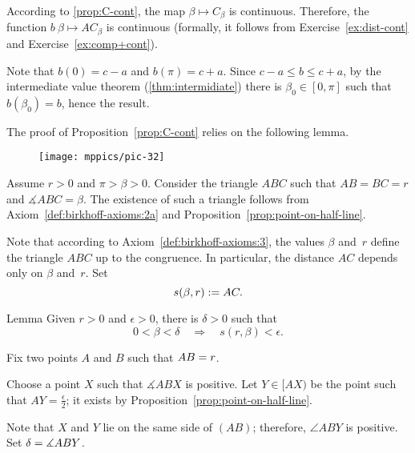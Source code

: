 According to \ref{prop:C-cont},
the map
$\beta\mapsto C_\beta$ is continuous.
Therefore, the function $b\:\beta\mapsto AC_\beta$ is continuous
(formally, it follows from Exercise~\ref{ex:dist-cont} and Exercise~\ref{ex:comp+cont}).

Note that $b(0)=c-a$ and $b(\pi)=c+a$.
Since $c-a\le b\le c+a$,
by the intermediate value theorem (\ref{thm:intermidiate})
there is $\beta_0\in[0,\pi]$ such that
$b(\beta_0)=b$,
hence the result. 
\qeds

The proof of Proposition~\ref{prop:C-cont} relies on the following lemma.

\begin{wrapfigure}{o}{27mm}
\vskip2mm
\centering
\texttt{[image: mppics/pic-32]}
\end{wrapfigure}

Assume $r>0$ and $\pi>\beta>0$.
Consider the triangle $ABC$ such that 
$AB=BC=r$ and $\measuredangle ABC=\beta$.
The existence of such a triangle follows from Axiom~\ref{def:birkhoff-axioms:2a} and Proposition~\ref{prop:point-on-half-line}.

Note that according to Axiom~\ref{def:birkhoff-axioms:3}, 
the values
$\beta$ and~$r$ define the triangle $ABC$ up to the congruence.
In particular, the distance $AC$ depends only on $\beta$ and~$r$.
Set 
$$s(\beta,r):= AC.$$

\begin{thm}[\abs]{Lemma}\label{lem:f(r,a)}
Given $r>0$ and $\epsilon>0$, there is $\delta>0$ such that
\[0<\beta<\delta\quad\Longrightarrow\quad s(r,\beta)<\epsilon.\]

\end{thm}

Fix two points $A$ and $B$ such that $AB=r$.

Choose a point $X$ such that $\measuredangle ABX$ is positive.
Let $Y\in [AX)$ be the point such that $AY=\tfrac\epsilon2$;
it exists by Proposition~\ref{prop:point-on-half-line}.

Note that $X$ and $Y$ lie on the same side of $(AB)$;
therefore, $\angle ABY$ is positive. 
Set $\delta=\measuredangle ABY$.


